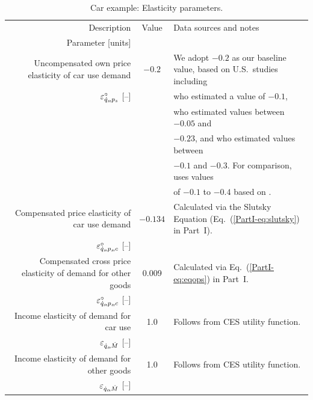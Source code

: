 \documentclass[12pt]{article}\usepackage[]{graphicx}\usepackage[]{xcolor}
\begin{document}
\begin{landscape}
\begin{table}
\footnotesize
\begin{center}
\caption{Car example: Elasticity parameters.}
\label{tab:car_elasticity_parameters}
\begin{tabular}{ r c l }
  \toprule
  Description & Value & Data sources and notes \\
  Parameter [units] & & \\
  \midrule
  Uncompensated own price elasticity of car use demand  & $-0.2$  & We adopt $-0.2$ as our baseline value, based on U.S.\ studies including \\
  $\varepsilon^\circ_{\dot{q}_s\!,p_s}$ [--]                                           &           &  \citet{Gillingham:2020aa} who estimated a value of $-0.1$, \\
                                                           &           &   \citet{goetzke2018} who estimated values between $-0.05$ and \\
                                                           &          &      $-0.23$, and \citet{Parry2005} who estimated values between \\
                                                             &           &    $-0.1$ and $-0.3$. For comparison, \citet{Borenstein:2015aa} uses values \\
                                                            &           &   of $-0.1$ to $-0.4$ based on \citet{Parry2005}.\\
  \midrule
  Compensated price elasticity of car use demand                   &   $-0.134$   & Calculated via the Slutsky Equation (Eq.~(\ref{PartI-eq:slutsky}) in Part~I).  \\
  $\varepsilon^\circ_{\dot{q}_s\!,p_s\!,c}$ [--]                                           &                                &   \\
  \midrule
  Compensated cross price elasticity of demand for other goods        &   0.009     & Calculated via Eq.~(\ref{PartI-eq:eqops}) in Part~I.  \\
  $\varepsilon^\circ_{\dot{q}_o\!,p_s\!,c}$ [--]                                           &                                &   \\
  \midrule
  Income elasticity of demand for car use                 &   1.0      & Follows from CES utility function. \\
  $\varepsilon_{\dot{q}_s\!,\dot{M}}$ [--]                                            &                                &   \\
  \midrule
  Income elasticity of demand for other goods             &   1.0      & Follows from CES utility function. \\
  $\varepsilon_{\dot{q}_o\!,\dot{M}}$ [--]                                            &                                &   \\
  \bottomrule
\end{tabular}
\end{center}
\end{table}
\end{landscape}
\end{document}
